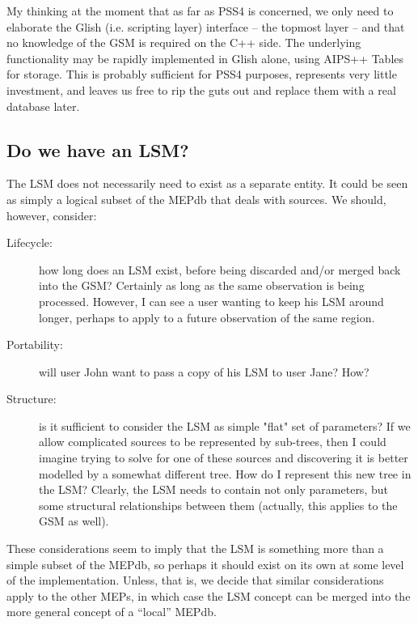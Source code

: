 \documentclass[]{lofar}
\begin{document}
  My thinking at the moment that as far as PSS4 is concerned, we only need to
  elaborate the Glish (i.e. scripting layer) interface -- the topmost layer --
  and that no knowledge of the GSM is required on the C++ side. The underlying
  functionality may be rapidly implemented in Glish alone, using AIPS++ Tables
  for storage. This is probably sufficient for PSS4 purposes, represents very
  little investment, and leaves us free to rip the guts out and replace them with
  a real database later. 
  
\subsection{Do we have an LSM?}
  
  The LSM does not necessarily need to exist as a separate entity. It could be
  seen as simply a logical subset of the MEPdb that deals with sources. We
  should, however, consider:
  
  \begin{description}
  
  \item[Lifecycle:] how long does an LSM exist, before being discarded and/or
  merged back into the GSM? Certainly as long as the same observation is being
  processed. However, I can see a user wanting to keep his LSM around longer,
  perhaps to apply to a future observation of the same region.
  
  \item[Portability:] will user John want to pass a copy of his LSM to user Jane?
  How?
  
  \item[Structure:] is it sufficient to consider the LSM as simple "flat" set of
  parameters? If we allow complicated sources to be represented by sub-trees,
  then I could imagine trying to solve for one of these sources and discovering
  it is better modelled by a somewhat different tree. How do I represent this new
  tree in the LSM? Clearly, the LSM needs to contain not only parameters, but
  some structural relationships between them (actually, this applies to the GSM as
  well).
  
  \end{description}
  
  These considerations seem to imply that the LSM is something more than a simple
  subset of the MEPdb, so perhaps it should exist on its own at some level of the
  implementation. Unless, that is, we decide that similar considerations apply to
  the other MEPs, in which case the LSM concept can be merged into the more
  general concept of a ``local'' MEPdb.
  
\end{document}
